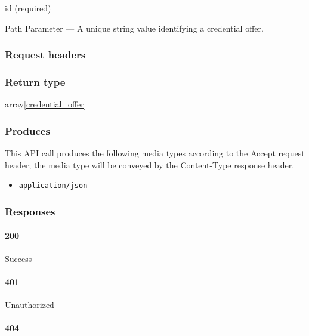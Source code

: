 id (required)

{Path Parameter} --- A unique string value identifying a credential
offer.

\hypertarget{request-headers-67}{%
\subsubsection{Request headers}\label{request-headers-67}}

\hypertarget{return-type-90}{%
\subsubsection{Return type}\label{return-type-90}}

array{[}\protect\hyperlink{credential_offer}{credential\_offer}{]}

\hypertarget{produces-116}{%
\subsubsection{Produces}\label{produces-116}}

This API call produces the following media types according to the
{Accept} request header; the media type will be conveyed by the
{Content-Type} response header.

\begin{itemize}
\tightlist
\item
  \texttt{application/json}
\end{itemize}

\hypertarget{responses-119}{%
\subsubsection{Responses}\label{responses-119}}

\hypertarget{section-389}{%
\paragraph{200}\label{section-389}}

Success

\hypertarget{section-390}{%
\paragraph{401}\label{section-390}}

Unauthorized \protect\hyperlink{}{}

\hypertarget{section-391}{%
\paragraph{404}\label{section-391}}

